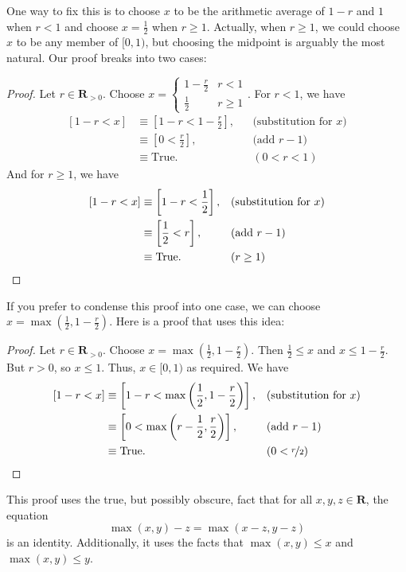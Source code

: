 \documentclass[12pt,fleqn]{article}
\newcommand{\reals}{\mathbf{R}}
\newcommand{\true}{\mathrm{True}}
\newenvironment{myproof}
  {\begin{shaded}\begin{proof}}
  {\end{proof}\end{shaded}}
\newcounter{ex}\setcounter{ex}{0}
\begin{document}
One way to fix this is to choose $x$ to be the arithmetic average of $1-r$ and $1$ when $r < 1$ and choose $x = \frac{1}{2}$ when $r \geq 1$. 
Actually, when $r \geq 1$, we could choose $x$ to be any member of $[0,1)$, but choosing the midpoint is arguably the most natural.
Our proof breaks into two cases:
     
      \begin{myproof} Let $r \in \reals_{>0}$. Choose $x = \begin{cases} 1 - \frac{r}{2}  & r < 1 \\ \frac{1}{2} & r \geq 1 \end{cases}$. For $r < 1$, we have
      \begin{align*}
       \left[1-r < x \right] &\equiv \left[1-r < 1 - \frac{r}{2}  \right], && \text{(substitution for $x$)} \\
                                  &\equiv  \left[0 <  \frac{r}{2}  \right], && \text{(add $r-1$)} \\
                                  &\equiv \true.   &&(0 < r < 1)
      \end{align*}
      And for $r \geq 1$, we have
       \begin{align*}
       \left[1-r < x \right] &\equiv \left[1-r < \frac{1}{2}  \right], && \text{(substitution for $x$)} \\
                                  &\equiv  \left[\frac{1}{2}  <  r  \right], && \text{(add $r-1$)} \\
                                  &\equiv \true.   &&(r \geq 1) \qedhere
      \end{align*}
      \end{myproof}
 If you prefer to condense this proof into one case, we can choose  
 $x = \max(\frac{1}{2}, 1-\frac{r}{2})$. Here is a proof that uses this idea:

 
     \begin{myproof} Let $r \in \reals_{>0}$. Choose $x = \max(\frac{1}{2}, 1-\frac{r}{2})$.  Then
     $\frac{1}{2} \leq x$ and  $x  \leq 1-\frac{r}{2}$. But $ r > 0$, so $x \leq 1$. Thus, $x \in [0,1)$ as required. We have     
      \begin{align*}
       \left[1-r < x \right] &\equiv \left[1-r <  \max \left(\frac{1}{2}, 1-\frac{r}{2} \right)  \right], && \text{(substitution for $x$)} \\
                                 &\equiv  \left[0 <  \max \left (r - \frac{1}{2}, \frac{r}{2} \right)  \right], && \text{(add $r-1$)} \\
                                  &\equiv \true.   &&(0 < \nicefrac{r}{2}) \qedhere
      \end{align*}
 \end{myproof}
 \noindent This proof uses the true, but possibly obscure, fact that for all $x,y,z \in \reals$, the equation 
 \begin{equation*}
    \max(x,y) - z = \max(x-z, y-z)
\end{equation*}
 is an identity.  Additionally, it uses the facts that $\max(x,y) \leq x$ and $\max(x,y) \leq y$.
 
\end{document}
